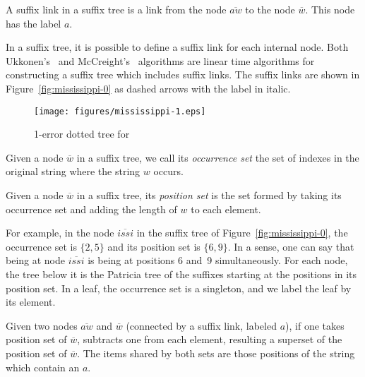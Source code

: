 \begin{definition}
A suffix link in a suffix tree is a link from the node $\overline{aw}$ to the node $\overline{w}$. This node has the label $a$.
\end{definition}

In a suffix tree, it is possible to define a suffix link for each internal node. Both Ukkonen's~\cite{ukkonen92constructing} and McCreight's~\cite{mccreight} algorithms are linear time algorithms for constructing a suffix tree which includes suffix links. The suffix links are shown in Figure~\ref{fig:mississippi-0} as dashed arrows with the label in italic.

\begin{figure}
\centering
\texttt{[image: figures/mississippi-1.eps]}
\caption{1-error dotted tree for }%
\label{fig:mississippi-1}
\end{figure}

\begin{definition}
Given a node $\overline{w}$ in a suffix tree, we call its \emph{occurrence set} the set of indexes in the original string where the string $w$ occurs.
\end{definition}

\begin{definition}
Given a node $\overline{w}$ in a suffix tree, its \emph{position set} is the set formed by taking its occurrence set and adding the length of $w$ to each element.
\end{definition}

For example, in the node $\overline{issi}$ in the suffix tree of Figure~\ref{fig:mississippi-0}, the occurrence set is $\{2, 5\}$ and its position set is $\{6, 9\}$. In a sense, one can say that being at node $\overline{issi}$ is being at positions 6 and~9 simultaneously. For each node, the tree below it is the Patricia tree of the suffixes starting at the positions in its position set. In a leaf, the occurrence set is a singleton, and we label the leaf by its element.

\begin{lemma}\label{lemma:suffix-error}
Given two nodes $\overline{aw}$ and $\overline{w}$ (connected by a suffix link, labeled $a$), if one takes position set of $\overline{w}$, subtracts one from each element, resulting a superset of the position set of $\overline{w}$. The items shared by both sets are those positions of the string which contain an $a$.
\end{lemma}

